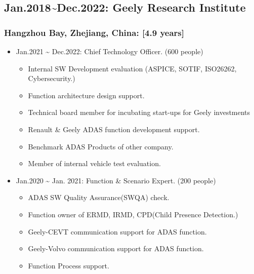 \documentclass[12pt,a4paper]{article}
\begin{document}
\subsection{Jan.2018{\textasciitilde}Dec.2022: Geely Research Institute}
\subsubsection{Hangzhou Bay, Zhejiang, China: [4.9 years]}
\begin{itemize}
\item Jan.2021 {\textasciitilde} Dec.2022: Chief Technology Officer. (600 people)

\begin{itemize}
\item Internal SW Development evaluation (ASPICE, SOTIF, ISO26262, Cybersecurity.)


\item Function architecture design support.


\item Technical board member for incubating start-ups for Geely investments


\item Renault \& Geely ADAS function development support.


\item Benchmark ADAS Products of other company.


\item Member of internal vehicle test evaluation.

\end{itemize}

\item Jan.2020 {\textasciitilde} Jan. 2021: Function \& Scenario Expert. (200 people)

\begin{itemize}
\item ADAS SW Quality Assurance(SWQA) check.


\item Function owner of ERMD, IRMD, CPD(Child Presence Detection.)


\item Geely-CEVT communication support for ADAS function.


\item Geely-Volvo communication support for ADAS function.


\item Function Process support. 

\end{itemize}


\end{itemize}
\end{document}
